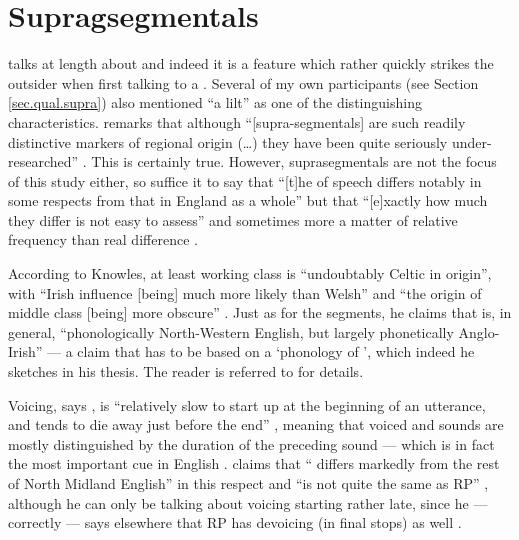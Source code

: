 	\section{Supragsegmentals}\label{sec.var.supra}

\citet{knowles1973} talks at length about   and indeed it is a feature which rather quickly strikes the outsider when first talking to a .
Several of my own participants (see Section \ref{sec.qual.supra}) also mentioned ``a lilt'' as one of the distinguishing characteristics.
\citeauthor{wales2006} remarks that although ``[supra-segmentals] are such readily distinctive markers of regional origin (\ldots) they have been quite seriously under-researched'' \citeyearpar[201]{wales2006}.
This is certainly true.
However, suprasegmentals are not the focus of this study either, so suffice it to say that ``[t]he  of  speech differs notably in some respects from that in England as a whole'' but that ``[e]xactly how much they differ is not easy to assess'' \citep[221]{knowles1973} and sometimes more a matter of relative frequency than real difference \citep[cf.][176]{knowles1973}.

According to Knowles, at least working class  is ``undoubtably Celtic in origin'', with ``Irish influence [being] much more likely than Welsh'' \citep[221--222]{knowles1973} and ``the origin of middle class   [being] more obscure'' \citep[222--223]{knowles1973}.
Just as for the segments, he claims that   is, in general, ``phonologically North-Western English, but largely phonetically Anglo-Irish'' \citep[225]{knowles1973} --- a claim that has to be based on a `phonology of ', which indeed he sketches in his thesis.
The reader is referred to \citet[174--226]{knowles1973} for details.

Voicing, says \citeauthor{knowles1973}, is ``relatively slow to start up at the beginning of an utterance, and tends to die away just before the end'' \citeyearpar[246]{knowles1973}, meaning that voiced and  sounds are mostly distinguished by the duration of the preceding sound --- which is in fact the most important cue in English \citep[cf., for instance,][]{hoganrozsypal1980}. \citeauthor{knowles1973} claims that `` differs markedly from the rest of North Midland English'' in this respect and ``is not quite the same as RP'' \citeyearpar[246]{knowles1973}, although he can only be talking about voicing starting rather late, since he --- correctly --- says elsewhere that RP has devoicing (in final stops) as well \citeyearpar[cf.][114]{knowles1973}.

